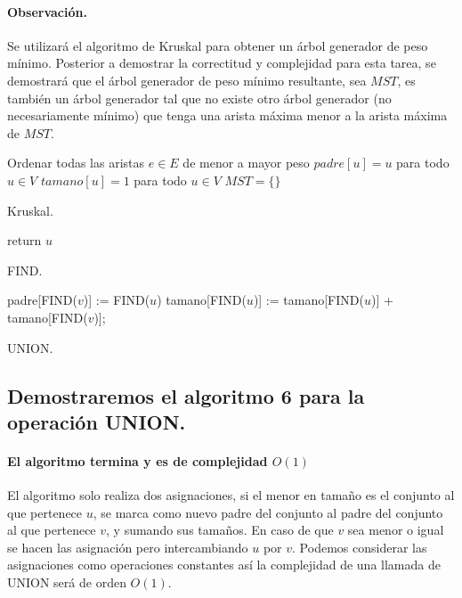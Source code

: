 \documentclass[12pt]{article}
\begin{document}
\paragraph{Observación.} Se utilizará el algoritmo de Kruskal para obtener un árbol generador de peso mínimo. Posterior a demostrar la correctitud y complejidad para esta tarea, se demostrará que el árbol generador de peso mínimo resultante, sea $MST$, es también un árbol generador tal que no existe otro árbol generador (no necesariamente mínimo) que tenga una arista máxima menor a la arista máxima de $MST$.\\
\begin{algorithm}[H]\footnotesize
	\SetAlgoLined
	Ordenar todas las aristas $e \in E$ de menor a mayor peso\;
	$padre[u]=u$ para todo $u\in V$\;
	$tamano[u]=1$ para todo $u\in V$\;
	$MST = \{\}$\;
	\caption{Kruskal.}
\end{algorithm}
\begin{algorithm}[H]\footnotesize
	\SetAlgoLined
	return $u$\;
	\caption{FIND.}
\end{algorithm}
\begin{algorithm}[H]\footnotesize
	\SetAlgoLined
	 {
	padre[FIND($v$)] := FIND($u$)\;
	tamano[FIND($u$)] := tamano[FIND($u$)] + tamano[FIND($v$)];
	}
	\caption{UNION.}
\end{algorithm}
\subsection{Demostraremos el algoritmo 6 para la operación UNION.}
\paragraph{El algoritmo termina y es de complejidad $O(1)$} El algoritmo solo realiza dos asignaciones, si el menor en tamaño es el conjunto al que pertenece $u$, se marca como nuevo padre del conjunto al padre del conjunto al que pertenece $v$, y sumando sus tamaños. En caso de que $v$ sea menor o igual se hacen las asignación pero intercambiando $u$ por $v$. Podemos considerar las asignaciones como operaciones constantes así la complejidad de una llamada de UNION será de orden $O(1)$.
\end{document}
